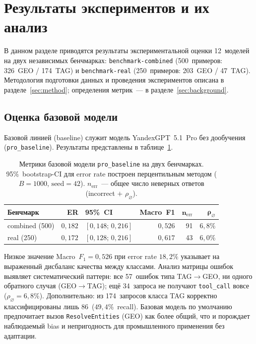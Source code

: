 
\section{Результаты экспериментов и их анализ} \label{sec:experiment}

В данном разделе приводятся результаты экспериментальной оценки 12~моделей на двух независимых бенчмарках: \texttt{benchmark-combined} (500~примеров: 326~GEO / 174~TAG) и \texttt{benchmark-real} (250~примеров: 203~GEO / 47~TAG). Методология подготовки данных и проведения экспериментов описана в разделе~\ref{sec:method}; определения метрик~--- в разделе~\ref{sec:background}.

\subsection{Оценка базовой модели} \label{subsec:baseline}

Базовой линией (baseline) служит модель YandexGPT~5.1~Pro без дообучения (\texttt{pro\_baseline}). Результаты представлены в таблице~\ref{tab:baseline_results}.

\begin{table}[H]
\centering
\caption{Метрики базовой модели \texttt{pro\_baseline} на двух бенчмарках. 95\%~bootstrap-CI для error rate построен перцентильным методом ($B = 1000$, $\mathrm{seed} = 42$). $n_\mathrm{err}$~--- общее число неверных ответов (incorrect $+$ $\rho_\varnothing$).}
\label{tab:baseline_results}
\def\arraystretch{1.15}
\setlength\tabcolsep{0.4em}
\begin{tabular}{l r l r r r}
    \toprule
    \textbf{Бенчмарк} & \textbf{ER} & \textbf{95\%~CI} & \textbf{Macro~F1} & $\boldsymbol{n_\mathrm{err}}$ & $\boldsymbol{\rho_\varnothing}$ \\
    \midrule
    combined (500) & $0{,}182$ & $[0{,}148;\,0{,}216]$ & $0{,}526$ & 91 & $6{,}8\%$ \\
    real (250)     & $0{,}172$ & $[0{,}128;\,0{,}216]$ & $0{,}617$ & 43 & $6{,}0\%$ \\
    \bottomrule
\end{tabular}
\end{table}

Низкое значение Macro~$F_1 = 0{,}526$ при error rate $18{,}2\%$ указывает на выраженный дисбаланс качества между классами. Анализ матрицы ошибок выявляет систематический паттерн: все 57~ошибок типа TAG$\to$GEO, ни одного обратного случая (GEO$\to$TAG); ещё 34~запроса не получают \texttt{tool\_call} вовсе ($\rho_\varnothing = 6{,}8\%$). Дополнительно: из 174~запросов класса TAG корректно классифицированы лишь 86~($49{,}4\%$~recall). Базовая модель по умолчанию предпочитает вызов \texttt{ResolveEntities} (GEO) как более общий, что и порождает наблюдаемый bias и непригодность для промышленного применения без адаптации.


